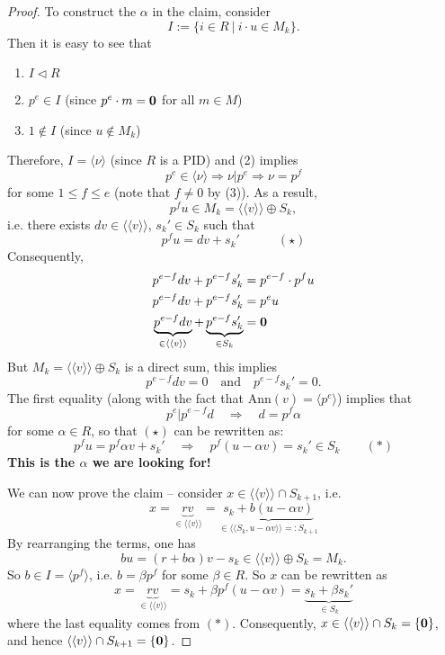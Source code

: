 \documentclass[12pt]{amsbook}
\begin{document}
\begin{proof}
    To construct the $\alpha$ in the claim, consider 
    $$I:=\{i\in R\ |\ i\cdot u\in M_k\}.$$
    Then it is easy to see that
    \begin{enumerate}
        \item $I\lhd R$ 
        \item $p^e\in I$ (since $p^e \cdot m = {\bf 0}$ for all $m \in M$)
        \item $1 \not\in I$ (since $u\notin M_k$)
    \end{enumerate}
    Therefore, $I = \langle \nu \rangle$ (since $R$ is a PID) and (2) implies 
    $$p^e \in \langle \nu \rangle \Rightarrow \nu|p^e \Rightarrow \nu = p^f$$
    for some $1 \leq f \leq e$ (note that $f \neq 0$ by (3)). As a result, 
    $$p^{f}u \in M_k =\langle\langle v \rangle\rangle \oplus S_k,$$ 
    i.e. there exists $dv \in \langle \langle v \rangle \rangle$, $s_k' \in S_k$ such that
    $$p^{f}u=dv+s_k' \quad \quad \quad (\star)$$
    Consequently,
    \begin{align*}
    p^{e-f}dv+p^{e-f}s_k' &= p^{e-f}\cdot p^{f}u \\
    p^{e-f}dv+p^{e-f}s_k' &= p^{e}u \\
    \underbrace{p^{e-f}dv}_{\in \langle \langle v \rangle \rangle} + \underbrace{p^{e-f}s_k'}_{\in S_k} &= {\bf 0}
    \end{align*}
    But $M_k = \langle\langle v \rangle\rangle \oplus S_k$ is a direct sum, this implies
    $${p^{e-f}d}v=0 \quad \text{and} \quad p^{e-f}s_k'=0.$$
    The first equality (along with the fact that $\mathrm{Ann}(v) = \langle p^e \rangle$) implies that
        $$p^e|p^{e-f}d \quad \Rightarrow \quad d=p^f\alpha$$
    for some $\alpha \in R$, so that $(\star)$ can be rewritten as:
    $$p^f u = p^f\alpha v + s_k' \quad \Rightarrow \quad p^f(u-\alpha v) = s_k' \in S_k \quad \quad (\ast)$$
    {\bf This is the $\alpha$ we are looking for!} 

    \medskip
    We can now prove the claim -- consider 
    $x\in \langle\langle v\rangle\rangle \cap S_{k+1}$, i.e. 
    $$x= \underbrace{rv}_{\in \langle \langle v \rangle \rangle} = \underbrace{s_k+b(u-\alpha v)}_{\in \langle \langle S_k, u-\alpha v\rangle \rangle =: S_{k+1}}$$
    By rearranging the terms, one has
    $$bu = (r + b\alpha) v - s_k \in \langle \langle v \rangle \rangle \oplus S_k = M_k.$$
    So $b \in I = \langle p^f \rangle$, i.e. $b = \beta p^f$ for some $\beta \in R$. So $x$ can be rewritten as
    $$x= \underbrace{rv}_{\in \langle \langle v \rangle \rangle} = s_k+\beta p^f(u-\alpha v) = \underbrace{s_k + \beta s_k'}_{\in S_k}$$
    where the last equality comes from $(\ast)$. Consequently, $x \in \langle \langle v \rangle \rangle \cap S_k = \{\bf 0\}$, and hence
    $\langle \langle v \rangle \rangle \cap S_{k+1} = \{\bf 0\}$.
    

\end{proof}
\end{document}
